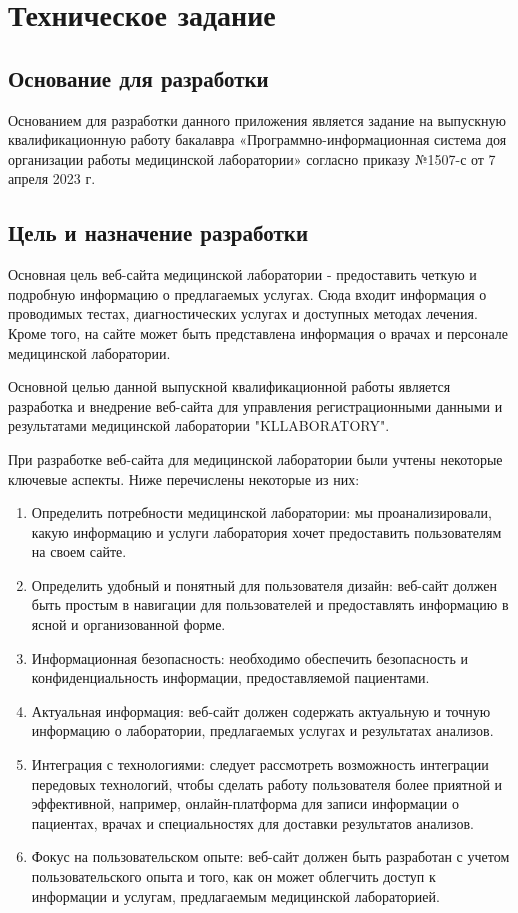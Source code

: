 \newsection
\section{Техническое задание}
\subsection{Основание для разработки}

Основанием для разработки данного приложения является задание на выпускную квалификационную работу бакалавра «Программно-информационная система доя организации работы медицинской лаборатории» согласно приказу №1507-с от 7 апреля 2023 г.

\subsection{Цель и назначение разработки}

Основная цель веб-сайта медицинской лаборатории - предоставить четкую и подробную информацию о предлагаемых услугах. Сюда входит информация о проводимых тестах, диагностических услугах и доступных методах лечения. Кроме того, на сайте может быть представлена информация о врачах и персонале медицинской лаборатории.

Основной целью данной выпускной квалификационной работы является разработка и внедрение веб-сайта для управления регистрационными данными и результатами медицинской лаборатории "KLLABORATORY".

При разработке веб-сайта для медицинской лаборатории были учтены некоторые ключевые аспекты. Ниже перечислены некоторые из них:

\begin{enumerate}
	\item Определить потребности медицинской лаборатории: мы проанализировали, какую информацию и услуги лаборатория хочет предоставить пользователям на своем сайте.
	\item Определить удобный и понятный для пользователя дизайн: веб-сайт должен быть простым в навигации для пользователей и предоставлять информацию в ясной и организованной форме.
	\item Информационная безопасность: необходимо обеспечить безопасность и конфиденциальность информации, предоставляемой пациентами.
	\item Актуальная информация: веб-сайт должен содержать актуальную и точную информацию о лаборатории, предлагаемых услугах и результатах анализов.
	\item Интеграция с технологиями: следует рассмотреть возможность интеграции передовых технологий, чтобы сделать работу пользователя более приятной и эффективной, например, онлайн-платформа для записи информации о пациентах, врачах и специальностях для доставки результатов анализов.
	\item Фокус на пользовательском опыте: веб-сайт должен быть разработан с учетом пользовательского опыта и того, как он может облегчить доступ к информации и услугам, предлагаемым медицинской лабораторией.   
\end{enumerate}

